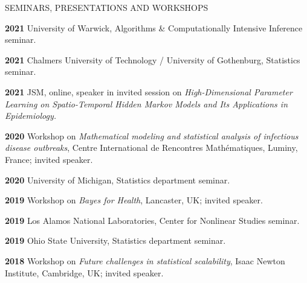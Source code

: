 \lsp







\begin{mylist}{SEMINARS, PRESENTATIONS AND WORKSHOPS}
  \setlength{\itemsep}{0.15 cm}
  
\item{\bf 2021} University of Warwick, Algorithms \& Computationally Intensive Inference seminar.
               
\item{\bf 2021} Chalmers University of Technology / University of Gothenburg, Statistics seminar.
                 
\item{\bf 2021} JSM, online, speaker in invited session on {\it High-Dimensional Parameter Learning on Spatio-Temporal Hidden Markov Models and Its Applications in Epidemiology.}
                 
\item{\bf 2020 } Workshop on {\it Mathematical modeling and statistical analysis of infectious disease outbreaks}, Centre International de Rencontres Math\'{e}matiques, Luminy, France; invited speaker.

\item{\bf 2020 } University of Michigan, Statistics department seminar.

\item{\bf 2019 } Workshop on {\it Bayes for Health}, Lancaster, UK; invited speaker.

  \item{\bf 2019 } Los Alamos National Laboratories, Center for Nonlinear Studies seminar.
  
  \item{\bf 2019 } Ohio State University, Statistics department seminar.
  
\item{\bf 2018 } Workshop on {\it Future challenges in statistical scalability}, Isaac Newton Institute, Cambridge, UK; invited speaker.


\end{mylist}
